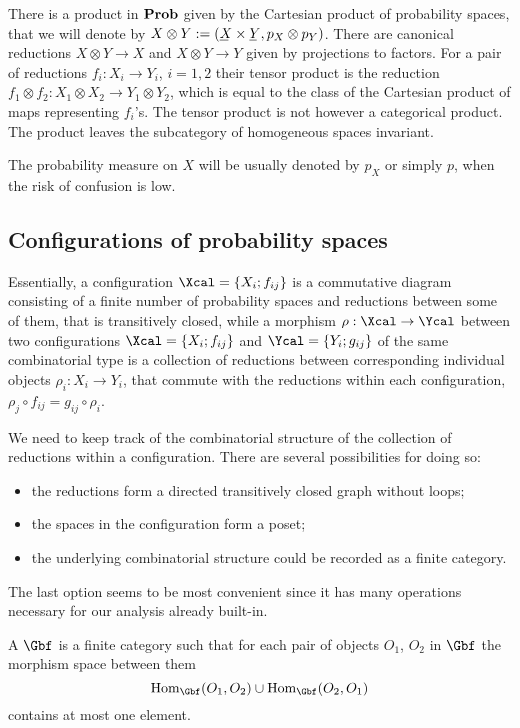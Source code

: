  There is a product in $\operatorname{\mathbf{Prob}}$ given by the Cartesian product of
  probability spaces, that we will denote by $X\otimes Y:=(\un
  X\times\un Y,p_{X}\otimes p_{Y})$. There are canonical reductions
  $X\otimes Y\to X$ and $X\otimes Y\to Y$ given by projections to
  factors. For a pair of reductions $f_{i}:X_{i}\to Y_{i}$, $i=1,2$
  their tensor product is the reduction $f_{1}\otimes
  f_{2}:X_{1}\otimes X_{2}\to Y_{1}\otimes Y_{2}$, which is equal to
  the class of the Cartesian product of maps representing $f_{i}$'s.
   The tensor product is not however a categorical product. The product
  leaves the subcategory of homogeneous spaces invariant.

  The probability measure on $X$ will be usually denoted by $p_{X}$ or
  simply $p$, when the risk of confusion is low.

\subsection{Configurations of probability spaces}
\label{s:category-config}
  Essentially, a configuration $\Xcal=\set{X_{i};f_{ij}}$ is a
  commutative diagram consisting of a finite number of probability spaces and
  reductions between some of them, that is transitively closed, while
  a morphism $\rho:\Xcal\to\Ycal$ between two configurations
  $\Xcal=\set{X_{i};f_{ij}}$ and $\Ycal=\set{Y_{i};g_{ij}}$ of the
  same combinatorial type is a collection of reductions between
  corresponding individual objects $\rho_{i}:X_{i}\to Y_{i}$, that
  commute with the reductions within each configuration,
  $\rho_{j}\circ f_{ij}=g_{ij}\circ\rho_{i}$.
  
  We need to keep track of the combinatorial structure of the
  collection of reductions within a configuration. There are several
  possibilities for doing so: 
  \begin{itemize}
  \item 
    the reductions form a directed transitively closed graph without
    loops;
  \item 
    the spaces in the configuration form a poset; 
  \item
    the underlying combinatorial structure could be recorded as a finite
    category. 
  \end{itemize}

  The last option seems to be most convenient since it has many
  operations necessary for our analysis already built-in.

  A  $\Gbf$ is a finite category such that
  for each pair of objects $O_{1}$, $O_{2}$ in $\Gbf$ the morphism
  space between them
  \[
    \Hom_{\Gbf}(O_{1},O_{2})\cup\Hom_{\Gbf}(O_{2},O_{1})
  \] 
  contains at most one element.

